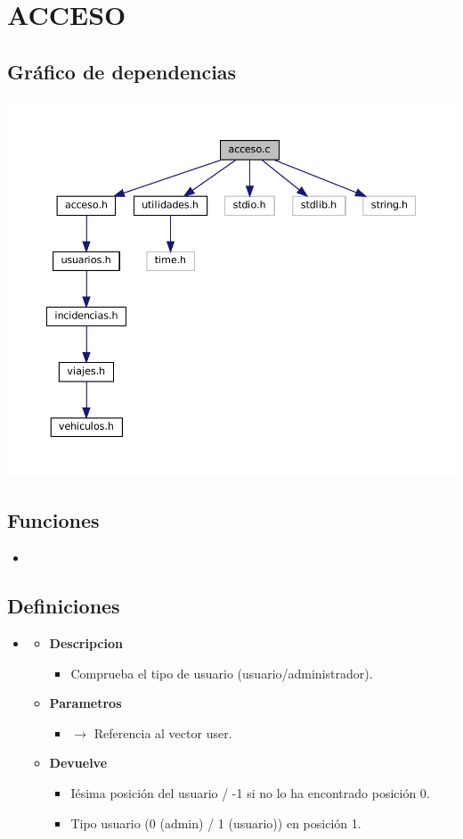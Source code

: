 \section{ACCESO}
\subsection{Gráfico de dependencias}
\includegraphics[width=\textwidth, angle=0]{dep/acceso_include.pdf}
\subsection{Funciones}
\begin{itemize}
    \item {}
\end{itemize}
\subsection{Definiciones}
\begin{itemize}
    \item {}
    \begin{itemize}
        \item \textbf{Descripcion}
        \begin{itemize}
			\item Comprueba el tipo de usuario (usuario/administrador).
		\end{itemize}
		\item \textbf{Parametros}
		\begin{itemize}
			\item {} $\rightarrow$ Referencia al vector user.
		\end{itemize}
		\item \textbf{Devuelve}
		\begin{itemize}
			\item Iésima posición del usuario / -1 si no lo ha encontrado posición 0.
			\item Tipo usuario (0 (admin) / 1 (usuario)) en posición 1.
		\end{itemize}
	\end{itemize}
\end{itemize}
\newpage
